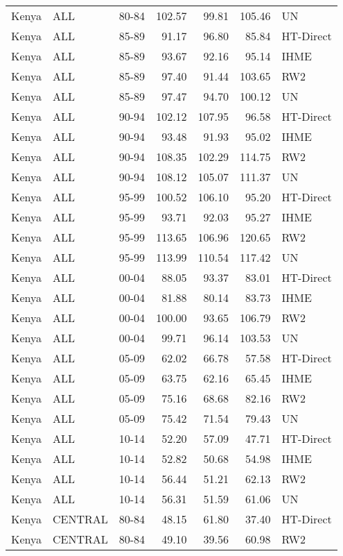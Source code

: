 \begin{longtable}{lllrrrl}
  Kenya & ALL & 80-84 & 102.57 & 99.81 & 105.46 & UN \\ 
  Kenya & ALL & 85-89 & 91.17 & 96.80 & 85.84 & HT-Direct \\ 
  Kenya & ALL & 85-89 & 93.67 & 92.16 & 95.14 & IHME \\ 
  Kenya & ALL & 85-89 & 97.40 & 91.44 & 103.65 & RW2 \\ 
  Kenya & ALL & 85-89 & 97.47 & 94.70 & 100.12 & UN \\ 
  Kenya & ALL & 90-94 & 102.12 & 107.95 & 96.58 & HT-Direct \\ 
  Kenya & ALL & 90-94 & 93.48 & 91.93 & 95.02 & IHME \\ 
  Kenya & ALL & 90-94 & 108.35 & 102.29 & 114.75 & RW2 \\ 
  Kenya & ALL & 90-94 & 108.12 & 105.07 & 111.37 & UN \\ 
  Kenya & ALL & 95-99 & 100.52 & 106.10 & 95.20 & HT-Direct \\ 
  Kenya & ALL & 95-99 & 93.71 & 92.03 & 95.27 & IHME \\ 
  Kenya & ALL & 95-99 & 113.65 & 106.96 & 120.65 & RW2 \\ 
  Kenya & ALL & 95-99 & 113.99 & 110.54 & 117.42 & UN \\ 
  Kenya & ALL & 00-04 & 88.05 & 93.37 & 83.01 & HT-Direct \\ 
  Kenya & ALL & 00-04 & 81.88 & 80.14 & 83.73 & IHME \\ 
  Kenya & ALL & 00-04 & 100.00 & 93.65 & 106.79 & RW2 \\ 
  Kenya & ALL & 00-04 & 99.71 & 96.14 & 103.53 & UN \\ 
  Kenya & ALL & 05-09 & 62.02 & 66.78 & 57.58 & HT-Direct \\ 
  Kenya & ALL & 05-09 & 63.75 & 62.16 & 65.45 & IHME \\ 
  Kenya & ALL & 05-09 & 75.16 & 68.68 & 82.16 & RW2 \\ 
  Kenya & ALL & 05-09 & 75.42 & 71.54 & 79.43 & UN \\ 
  Kenya & ALL & 10-14 & 52.20 & 57.09 & 47.71 & HT-Direct \\ 
  Kenya & ALL & 10-14 & 52.82 & 50.68 & 54.98 & IHME \\ 
  Kenya & ALL & 10-14 & 56.44 & 51.21 & 62.13 & RW2 \\ 
  Kenya & ALL & 10-14 & 56.31 & 51.59 & 61.06 & UN \\ 
  Kenya & CENTRAL & 80-84 & 48.15 & 61.80 & 37.40 & HT-Direct \\ 
  Kenya & CENTRAL & 80-84 & 49.10 & 39.56 & 60.98 & RW2 \\ 

\end{longtable}
